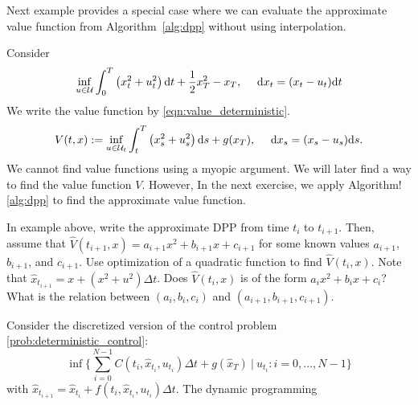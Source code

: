 \documentclass[11pt]{book}
\newcommand{\dt}{\text{\normalfont d}t}
\newcommand{\ds}{\text{\normalfont d}s}
\newcommand{\dx}{\text{\normalfont d}x}
\begin{document}
Next example provides a special case where we can evaluate the approximate value function from Algorithm~\ref{alg:dpp} without using interpolation.
\begin{eg}
    Consider 
    \begin{equation}
    \inf_{u\in\mathcal{U}} \int_0^T\left(x_t^2+u_t^2\right){{\dt}}+\frac12x_T^2-x_T,~~~~{\dx}_t=(x_t-u_t){{\dt}}
\end{equation}
We write the value function by \eqref{eqn:value_deterministic}. 
\begin{equation}
    V(t,x):= \inf_{u\in\mathcal{U}_{t}}\int_t^T\left(x_s^2+u_s^2\right){{\ds}}+g(x_T),~~~~{\dx}_s=(x_s-u_s){{\ds}}.
\end{equation}
We cannot find value functions using a myopic argument. We will later find a way to find the value function $V$. However, In the next exercise, we apply Algorithm!\ref{alg:dpp} to find the approximate value function.  
\end{eg}
\begin{ex}
    In example above, write the approximate DPP from time $t_{i}$ to $t_{i+1}$. Then, assume that $\hat{V}(t_{i+1},x)=a_{i+1}x^2+b_{i+1}x+c_{i+1}$ for some known values $a_{i+1}$, $b_{i+1}$, and $c_{i+1}$. Use  optimization of a quadratic function to find $\hat{V}(t_{i},x)$. Note that $\hat{x}_{t_{i+1}}=x+(x^2+u^2)\Delta t$. Does $\hat{V}(t_{i},x)$ is of the form $a_{i}x^2+b_{i}x+c_{i}$? What is the relation between $(a_{i},b_{i},c_{i})$ and $(a_{i+1},b_{i+1},c_{i+1})$.
\end{ex}



Consider the discretized version of the control problem \eqref{prob:deterministic_control}:
\begin{equation}
    \label{prob:discrete_deterministic_control}
    \inf\Big\{\sum_{i=0}^{N-1}C(t_i,\hat{x}_{t_i},u_{t_i}){{\Delta t}}+g(\hat{x}_{T})~|~{u_{t_i}:i=0,...,N-1}\Big\}
\end{equation}
with $\hat{x}_{t_{i+1}} = \hat{x}_{t_i} + f(t_i,\hat{x}_{t_i},u_{t_i}){\Delta t}$. The dynamic programming 
\end{document}

